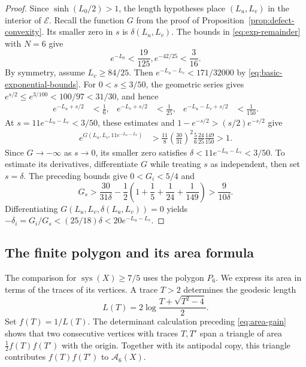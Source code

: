 \documentclass[10pt,twoside]{article}
\theoremstyle{plain}
\theoremstyle{definition}
\theoremstyle{remark}
\DeclareMathOperator{\sys}{sys}
\newcommand{\A}{\mathcal A}
\begin{document}
\begin{proof}
Since $\sinh(L_0/2)>1$, the length hypotheses place $(L_u,L_v)$
in the interior of $\mathcal E$. Recall the function $G$ from the
proof of Proposition~\ref{prop:defect-convexity}. Its smaller zero
in $s$ is $\delta(L_u,L_v)$.
The bounds in \eqref{eq:exp-remainder} with $N=6$ give
\begin{equation}
\label{eq:basic-exponential-bounds}
e^{-L_0}<\frac{19}{125},
e^{-42/25}<\frac3{16}.
\end{equation}
By symmetry, assume $L_v\geq84/25$. Then
$e^{-L_u-L_v}<171/32000$ by \eqref{eq:basic-exponential-bounds}.
For $0<s\leq3/50$, the geometric series gives
$e^{s/2}\leq e^{3/100}<100/97<31/30$, and hence
$$
\begin{aligned}
e^{-L_u+s/2}&<\frac16,&
e^{-L_v+s/2}&<\frac1{25},&
e^{-L_u-L_v+s/2}&<\frac1{150}.
\end{aligned}
$$
At $s=11e^{-L_u-L_v}<3/50$, these estimates and
$1-e^{-s/2}>(s/2)e^{-s/2}$ give
$$
\begin{aligned}
e^{G(L_u,L_v,11e^{-L_u-L_v})}
&>\frac{11}{8}\left(\frac{30}{31}\right)^2
\frac56\frac{24}{25}\frac{149}{150}
>1.
\end{aligned}
$$
Since $G\to-\infty$ as $s\to0$, its smaller zero satisfies
$\delta<11e^{-L_u-L_v}<3/50$. To estimate its derivatives,
differentiate $G$ while treating $s$ as independent, then set $s=\delta$.
The preceding bounds give $0<G_i<5/4$ and
$$
G_s>\frac{30}{31\delta}
-\frac12\left(1+\frac15+\frac1{24}+\frac1{149}\right)
>\frac9{10\delta}.
$$
Differentiating $G(L_u,L_v,\delta(L_u,L_v))=0$ yields
$-\delta_i=G_i/G_s<(25/18)\delta<20e^{-L_u-L_v}$.
\end{proof}

\subsection{The finite polygon and its area formula}
\label{sec:finite}

The comparison for $\sys(X)\geq7/5$ uses the polygon $P_6$.
We express its area in terms of the traces of its vertices.
A trace $T>2$ determines the geodesic length
$$
L(T)=2\log\frac{T+\sqrt{T^2-4}}2.
$$
Set $f(T)=1/L(T)$. The determinant calculation preceding
\eqref{eq:area-gain} shows that two consecutive vertices with
traces $T,T'$ span a triangle of area $\frac12 f(T)f(T')$
with the origin. Together with its antipodal copy, this triangle
contributes $f(T)f(T')$ to $\A_6(X)$.
\end{document}
